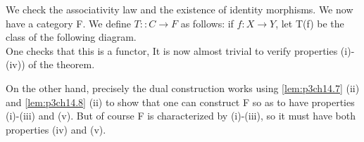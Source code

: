 \documentclass[../main]{subfiles}
\begin{document}
We check the associativity law and the existence of identity morphisms. We now have a category F. We define $T:\colon C \to F$ as follows: if $f\colon X \to Y$, let T(f) be the class of the following diagram.
~\\
One checks that this is a functor, It is now almost trivial to verify properties (i)-(iv)) of the theorem.

On the other hand, precisely the dual construction works using \ref{lem:p3ch14.7} (ii) and \ref{lem:p3ch14.8} (ii) to show that one can construct F so as to have properties (i)-(iii) and (v). But of course F is characterized by (i)-(iii), so it must have both properties (iv) and (v). 
\end{document}
